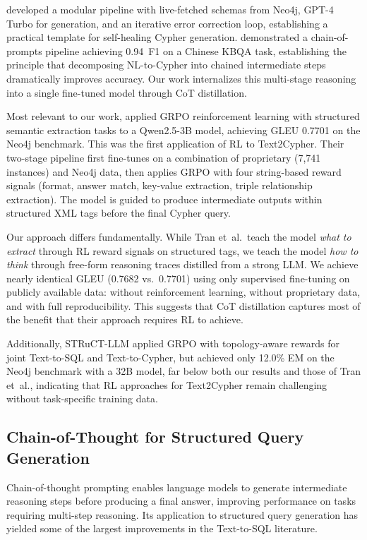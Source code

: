 \documentclass[11pt]{article}
\begin{document}
\citet{hornsteiner2024realtime} developed a modular pipeline with live-fetched schemas from Neo4j, GPT-4 Turbo for generation, and an iterative error correction loop, establishing a practical template for self-healing Cypher generation. \citet{feng2023chain} demonstrated a chain-of-prompts pipeline achieving 0.94~F1 on a Chinese KBQA task, establishing the principle that decomposing NL-to-Cypher into chained intermediate steps dramatically improves accuracy. Our work internalizes this multi-stage reasoning into a single fine-tuned model through CoT distillation.

Most relevant to our work, \citet{tran2025refining} applied GRPO reinforcement learning with structured semantic extraction tasks to a Qwen2.5-3B model, achieving GLEU 0.7701 on the Neo4j benchmark. This was the first application of RL to Text2Cypher. Their two-stage pipeline first fine-tunes on a combination of proprietary (7,741 instances) and Neo4j data, then applies GRPO with four string-based reward signals (format, answer match, key-value extraction, triple relationship extraction). The model is guided to produce intermediate outputs within structured XML tags before the final Cypher query.

Our approach differs fundamentally. While Tran et~al.\ teach the model \emph{what to extract} through RL reward signals on structured tags, we teach the model \emph{how to think} through free-form reasoning traces distilled from a strong LLM. We achieve nearly identical GLEU (0.7682 vs.\ 0.7701) using only supervised fine-tuning on publicly available data: without reinforcement learning, without proprietary data, and with full reproducibility. This suggests that CoT distillation captures most of the benefit that their approach requires RL to achieve.

Additionally, STRuCT-LLM \citep{structllm2025} applied GRPO with topology-aware rewards for joint Text-to-SQL and Text-to-Cypher, but achieved only 12.0\% EM on the Neo4j benchmark with a 32B model, far below both our results and those of Tran et~al., indicating that RL approaches for Text2Cypher remain challenging without task-specific training data.

\subsection{Chain-of-Thought for Structured Query Generation}

Chain-of-thought prompting \citep{wei2022cot} enables language models to generate intermediate reasoning steps before producing a final answer, improving performance on tasks requiring multi-step reasoning. Its application to structured query generation has yielded some of the largest improvements in the Text-to-SQL literature.
\end{document}
